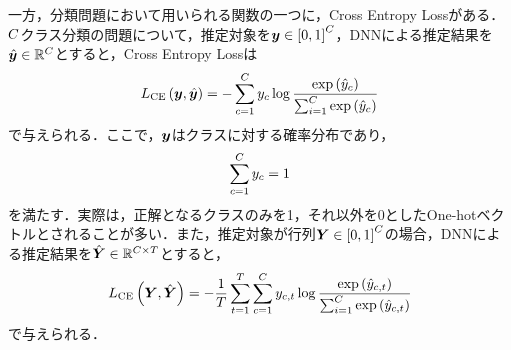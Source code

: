 一方，分類問題において用いられる関数の一つに，Cross Entropy Lossがある．$C$クラス分類の問題について，推定対象を$\bm{y} \in \left[0, 1\right]^{C}$，DNNによる推定結果を$\hat{\bm{y}} \in \mathbb{R}^{C}$とすると，Cross Entropy Lossは
\begin{equation}
    L_{\text{CE}}\left(\bm{y}, \hat{\bm{y}}\right) = - \sum_{c = 1}^{C} y_{c} \log \frac{\exp\left(\hat{y}_{c}\right)}{\sum_{i = 1}^{C} \exp\left(\hat{y}_{c}\right)}
\end{equation}
で与えられる．ここで，$\bm{y}$はクラスに対する確率分布であり，
\begin{equation}
    \sum_{c = 1}^{C} y_{c} = 1
\end{equation}
を満たす．実際は，正解となるクラスのみを1，それ以外を0としたOne-hotベクトルとされることが多い．また，推定対象が行列$\bm{Y} \in \left[0, 1\right]^{C}$の場合，DNNによる推定結果を$\hat{\bm{Y}} \in \mathbb{R}^{C \times T}$とすると，
\begin{equation}
    L_{\text{CE}}\left(\bm{Y}, \hat{\bm{Y}}\right) = - \frac{1}{T} \sum_{t = 1}^{T} \sum_{c = 1}^{C} y_{c, t} \log \frac{\exp\left(\hat{y}_{c, t}\right)}{\sum_{i = 1}^{C} \exp\left(\hat{y}_{c, t}\right)}
\end{equation}
で与えられる．

